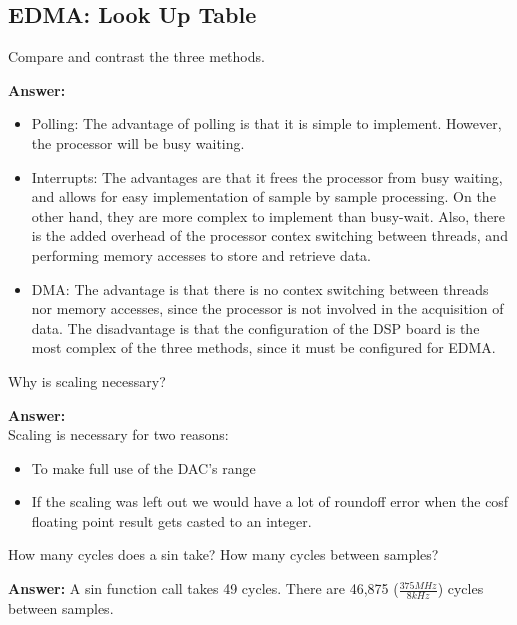 \documentclass{article}
\begin{document}
\subsection{EDMA: Look Up Table}

\begin{enumerate}

  \begin{item}
    Compare and contrast the three methods.

  \textbf{Answer:}

    \begin{itemize}
      \item Polling: The advantage of polling is that it is simple to implement. However, the processor will be busy waiting.
      \item Interrupts: The advantages are that it frees the processor from busy waiting, and allows for easy implementation of sample by sample processing. 
        On the other hand, they are more complex to implement than busy-wait.
        Also, there is the added overhead of the processor contex switching between threads, and performing memory accesses to store and retrieve data.
      \item DMA: The advantage is that there is no contex switching between threads nor memory accesses, since the processor is not involved in the acquisition of data. 
        The disadvantage is that the configuration of the DSP board is the most complex of the three methods, since it must be configured for EDMA.
    \end{itemize}

  \end{item}

  \begin{item}
    Why is scaling necessary?

  \textbf{Answer:}\\
    Scaling is necessary for two reasons:
    \begin{itemize}
      \item To make full use of the DAC's range
      \item If the scaling was left out we would have a lot of roundoff error when the cosf floating point result gets casted to an integer.
    \end{itemize}


  \end{item}

  \begin{item}
    How many cycles does a sin take? How many cycles between samples?

  \textbf{Answer:}
    A sin function call takes 49 cycles.
    There are 46,875 ($\frac{375 MHz}{8 kHz}$) cycles between samples.

  \end{item}
\end{enumerate}





\end{document}
